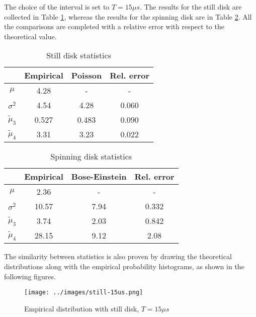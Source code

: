 \documentclass[10pt, a4paper, final]{article}
\begin{document}
\begin{multicols}{2}
The choice of the interval is set to $T = 15\mu s$.  
The results for the still disk are collected in Table \ref{still_mom}, whereas the results for the spinning disk are in Table \ref{spin_mom}. All the comparisons are completed with a relative error with respect to the theoretical value. 
\begin{mdframed}
    \begin{table}[H]
        \begin{tabular}{ |c||c|c|c| }
            \hline
             & Empirical & Poisson & Rel. error \\
            \hline
            \hline
            $\mu$            & 4.28 & - & - \\
            \hline
            $\sigma^2$       & 4.54 & 4.28 & 0.060 \\   
            \hline
            $\tilde{\mu}_3$  & 0.527& 0.483 & 0.090 \\ 
            \hline
            $\tilde{\mu}_4$  & 3.31 & 3.23 & 0.022 \\ 
            \hline
        \end{tabular}
        \caption{Still disk statistics}
        \label{still_mom}
    \end{table}
\end{mdframed}

\begin{mdframed}
    \begin{table}[H]
        \begin{tabular}{ |c||c|c|c| }
            \hline
             & Empirical & Bose-Einstein & Rel. error \\
            \hline
            \hline
            $\mu$            & 2.36 & - & - \\
            \hline
            $\sigma^2$       & 10.57 & 7.94 & 0.332 \\   
            \hline
            $\tilde{\mu}_3$  & 3.74 & 2.03 & 0.842 \\ 
            \hline
            $\tilde{\mu}_4$  & 28.15 & 9.12 & 2.08 \\ 
            \hline
        \end{tabular}
        \caption{Spinning disk statistics}
        \label{spin_mom}
    \end{table}
\end{mdframed}

The similarity between statistics is also proven by drawing the theoretical distributions along with the empirical probability histograms, as shown in the following figures. 

\end{multicols}
\vspace{50pt}
\begin{mdframed}
  \begin{figure}[H]
  \centering
  \texttt{[image: ../images/still-15us.png]}
  \caption{Empirical distribution with still disk, $T = 15\mu s$}
\end{figure}
\end{mdframed}
\end{document}
